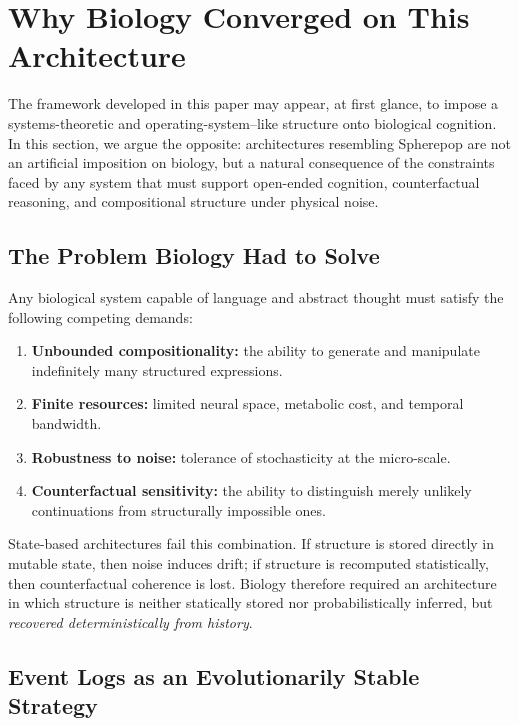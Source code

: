 \documentclass[11pt]{article}
\begin{document}
\section{Why Biology Converged on This Architecture}
\label{sec:why_biology}

The framework developed in this paper may appear, at first glance, to impose a systems-theoretic and operating-system–like structure onto biological cognition. In this section, we argue the opposite: architectures resembling Spherepop are not an artificial imposition on biology, but a natural consequence of the constraints faced by any system that must support open-ended cognition, counterfactual reasoning, and compositional structure under physical noise.

\subsection{The Problem Biology Had to Solve}

Any biological system capable of language and abstract thought must satisfy the following competing demands:

\begin{enumerate}
  \item \textbf{Unbounded compositionality:} the ability to generate and manipulate indefinitely many structured expressions.
  \item \textbf{Finite resources:} limited neural space, metabolic cost, and temporal bandwidth.
  \item \textbf{Robustness to noise:} tolerance of stochasticity at the micro-scale.
  \item \textbf{Counterfactual sensitivity:} the ability to distinguish merely unlikely continuations from structurally impossible ones.
\end{enumerate}

State-based architectures fail this combination. If structure is stored directly in mutable state, then noise induces drift; if structure is recomputed statistically, then counterfactual coherence is lost. Biology therefore required an architecture in which structure is neither statically stored nor probabilistically inferred, but \emph{recovered deterministically from history}.

\subsection{Event Logs as an Evolutionarily Stable Strategy}
\end{document}
